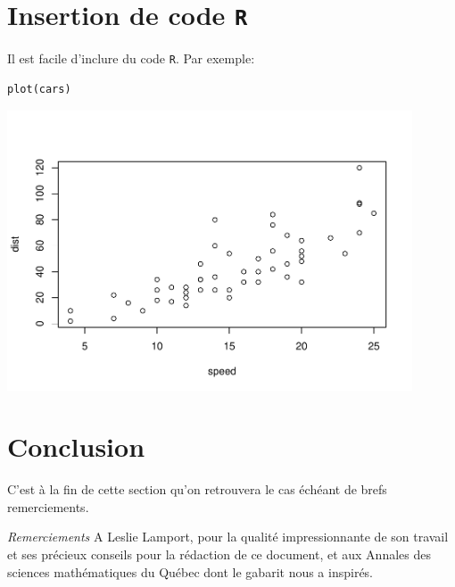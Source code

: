 \documentclass[10pt]{article}
\begin{document}
\hypertarget{insertion-de-code-r}{%
\section{\texorpdfstring{Insertion de code
\texttt{R}}{Insertion de code R}}\label{insertion-de-code-r}}

Il est facile d'inclure du code \texttt{R}. Par exemple:

\begin{verbatim}
plot(cars)
\end{verbatim}

\includegraphics[width=0.9\textwidth]{BAA_files/figure-latex/unnamed-chunk-1-1}

\hypertarget{conclusion}{%
\section{\texorpdfstring{Conclusion
\label{sec6}}{Conclusion }}\label{conclusion}}

C'est à la fin de cette section qu'on retrouvera le cas échéant de brefs
remerciements.

\emph{Remerciements} A Leslie Lamport\cite{lamp}, pour la qualité
impressionnante de son travail et ses précieux conseils pour la
rédaction de ce document, et aux Annales des sciences mathématiques du
Québec dont le gabarit nous a inspirés.


\end{document}
